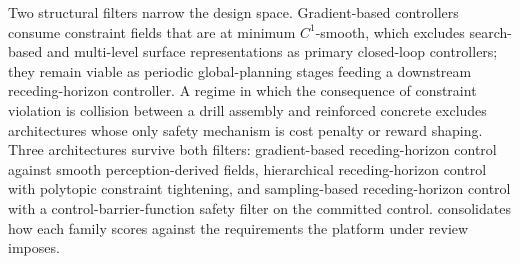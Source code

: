 \documentclass[11pt,a4paper]{article}
\begin{document}
Two structural filters narrow the design space. Gradient-based controllers consume constraint fields that are at minimum $C^1$-smooth, which excludes search-based and multi-level surface representations as primary closed-loop controllers; they remain viable as periodic global-planning stages feeding a downstream receding-horizon controller. A regime in which the consequence of constraint violation is collision between a drill assembly and reinforced concrete excludes architectures whose only safety mechanism is cost penalty or reward shaping. Three architectures survive both filters: gradient-based receding-horizon control against smooth perception-derived fields, hierarchical receding-horizon control with polytopic constraint tightening, and sampling-based receding-horizon control with a control-barrier-function safety filter on the committed control.  consolidates how each family scores against the requirements the platform under review imposes.
\end{document}
